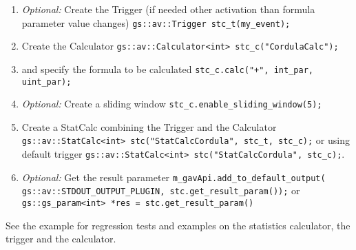 \begin{enumerate}

  \item {\em Optional:} Create the Trigger (if needed other activation than formula parameter value changes) \newline
  	\phantom{s} \lstinline|gs::av::Trigger stc_t(my_event);|
	
  \item Create the Calculator \newline
  	\phantom{s} \lstinline|gs::av::Calculator<int> stc_c("CordulaCalc");|

  \item and specify the formula to be calculated \newline
  	\phantom{s} \lstinline|stc_c.calc("+", int_par, uint_par);|
 
  \item {\em Optional:} Create a sliding window \newline
  	\phantom{s} \lstinline|stc_c.enable_sliding_window(5);|
 
  \item Create a StatCalc combining the Trigger and the Calculator \newline
	\phantom{s} \lstinline|gs::av::StatCalc<int> stc("StatCalcCordula", stc_t, stc_c);| \newline
	or using default trigger \newline
	\phantom{s} \lstinline|gs::av::StatCalc<int> stc("StatCalcCordula", stc_c);|.

  \item {\em Optional:} Get the result parameter \newline
  	\phantom{s} \lstinline|m_gavApi.add_to_default_output(|\newline
    \phantom{s} \lstinline|gs::av::STDOUT_OUTPUT_PLUGIN, stc.get_result_param());| \newline
	or\newline
	\phantom{s} \lstinline|gs::gs_param<int> *res = stc.get_result_param()|

\end{enumerate}


See the example  for regression tests and examples on the statistics calculator, the trigger and the calculator.


